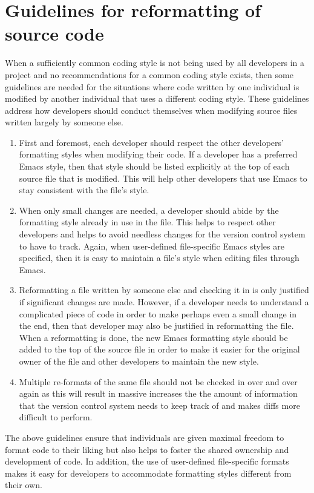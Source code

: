%
\section{Guidelines for reformatting of source code}
\label{sec:reformatting-guidelines}
%

When a sufficiently common coding style is not being used by all developers in
a project and no recommendations for a common coding style exists, then some
guidelines are needed for the situations where code written by one individual
is modified by another individual that uses a different coding style.  These
guidelines address how developers should conduct themselves when modifying
source files written largely by someone else.

\begin{enumerate}

{}\item First and foremost, each developer should respect the other
developers' formatting styles when modifying their code.  If a
developer has a preferred Emacs style, then that style should be
listed explicitly at the top of each source file that is modified.
This will help other developers that use Emacs to stay consistent with
the file's style.

{}\item When only small changes are needed, a developer should abide by the
formatting style already in use in the file.  This helps to respect other
developers and helps to avoid needless changes for the version control system
to have to track.  Again, when user-defined file-specific Emacs styles are
specified, then it is easy to maintain a file's style when editing files
through Emacs.

{}\item Reformatting a file written by someone else and checking it in
is only justified if significant changes are made.  However, if a
developer needs to understand a complicated piece of code in order to
make perhaps even a small change in the end, then that developer may
also be justified in reformatting the file.  When a reformatting is
done, the new Emacs formatting style should be added to the top of the
source file in order to make it easier for the original owner of the
file and other developers to maintain the new style.

{}\item Multiple re-formats of the same file should not be checked in over and
over again as this will result in massive increases the the amount of
information that the version control system needs to keep track of and makes
diffs more difficult to perform.

\end{enumerate}

The above guidelines ensure that individuals are given maximal freedom to
format code to their liking but also helps to foster the shared ownership and
development of code.  In addition, the use of user-defined file-specific
formats makes it easy for developers to accommodate formatting styles
different from their own.
